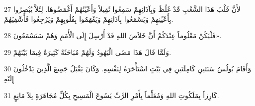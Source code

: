 \par 27 لأَنَّ قَلْبَ هَذَا الشَّعْبِ قَدْ غَلُظَ وَبِآذَانِهِمْ سَمِعُوا ثَقِيلاً وَأَعْيُنُهُمْ أَغْمَضُوهَا. لِئَلاَّ يُبْصِرُوا بِأَعْيُنِهِمْ وَيَسْمَعُوا بِآذَانِهِمْ وَيَفْهَمُوا بِقُلُوبِهِمْ وَيَرْجِعُوا فَأَشْفِيَهُمْ.
\par 28 فَلْيَكُنْ مَعْلُوماً عِنْدَكُمْ أَنَّ خَلاَصَ اللهِ قَدْ أُرْسِلَ إِلَى الْأُمَمِ وَهُمْ سَيَسْمَعُونَ».
\par 29 وَلَمَّا قَالَ هَذَا مَضَى الْيَهُودُ وَلَهُمْ مُبَاحَثَةٌ كَثِيرَةٌ فِيمَا بَيْنَهُمْ.
\par 30 وَأَقَامَ بُولُسُ سَنَتَينِ كَامِلَتَينِ فِي بَيْتٍ اسْتَأْجَرَهُ لِنَفْسِهِ. وَكَانَ يَقْبَلُ جَمِيعَ الَّذِينَ يَدْخُلُونَ إِلَيْهِ
\par 31 كَارِزاً بِمَلَكُوتِ اللهِ وَمُعَلِّماً بِأَمْرِ الرَّبِّ يَسُوعَ الْمَسِيحِ بِكُلِّ مُجَاهَرَةٍ بِلاَ مَانِعٍ.


